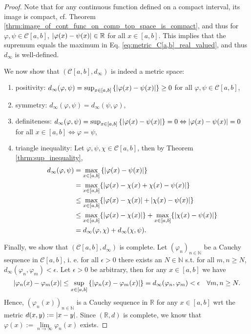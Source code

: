 \begin{proof}
	Note that for any continuous function defined on a compact interval, its image is compact, cf. Theorem \ref{thrm:image_of_cont_func_on_comp_top_space_is_compact}, and thus for $\varphi, \psi\in \mathcal C[a, b]$, $\left\vert \varphi(x) - \psi(x) \right\vert\in\mathbb R$ for all $x\in [a, b]$. This implies that the supremum equals the maximum in Eq. \eqref{eq:metric_C[a,b]_real_valued}, and thus $d_{\infty}$ is well-defined.

	We now show that $(\mathcal C[a, b], d_{\infty})$ is indeed a metric space:
	\begin{enumerate}
		\item positivity: $d_{\infty}(\varphi, \psi) = \sup_{x\in [a, b]}\left\{ \left\vert \varphi(x) - \psi(x) \right\vert \right\}\geq 0$ for all $\varphi, \psi\in\mathcal C[a, b]$,
		\item symmetry: $d_{\infty}(\varphi, \psi) = d_{\infty}(\psi, \varphi)$,
		\item definiteness: $d_{\infty}(\varphi, \psi) = \sup_{x\in [a, b]}\left\{ \left\vert \varphi(x) - \psi(x) \right\vert \right\} = 0 \Leftrightarrow \left\vert \varphi(x) - \psi(x) \right\vert = 0$ for all $x\in[a, b]\Leftrightarrow\varphi = \psi$,
		\item triangle inequality: Let $\varphi, \psi, \chi\in \mathcal C[a, b]$, then by Theorem \ref{thrm:sup_inequality}, \begin{align*}
			d_{\infty}(\varphi, \psi) &= \max_{x\in [a, b]}\left\{ \left\vert \varphi(x) - \psi(x) \right\vert \right\} 
			\\ &= \max_{x\in [a, b]}\{\left\vert \varphi(x) - \chi(x) + \chi(x) - \psi(x) \right\vert\}
			\\ &\leq \max_{x\in [a, b]}\{\left\vert \varphi(x) - \chi(x) \right\vert + \left\vert \chi(x) - \psi(x) \right\vert\}
			\\ &\leq \max_{x\in [a, b]}\{\left\vert \varphi(x) - \chi(x) \right\vert\} 
			+ \max_{x\in[a, b]}\{\left\vert \chi(x) - \psi(x) \right\vert\} \\ &= d_{\infty}(\varphi, \chi) + d_{\infty}(\chi, \psi).
		\end{align*}
	\end{enumerate}
	
	Finally, we show that $(\mathcal C[a, b], d_{\infty})$ is complete. Let $(\varphi_n)_{n\in\mathbb N}$ be a Cauchy sequence in $\mathcal C[a, b]$, i. e. for all $\epsilon > 0$ there exists an $N\in\mathbb N$ s.t. for all $m, n\geq N$, $d_{\infty}(\varphi_n, \varphi_m) < \epsilon$. Let $\epsilon > 0$ be arbitrary, then for any $x\in [a, b]$ we have
	\begin{align}
		\left\vert \varphi_n(x) - \varphi_m(x) \right\vert \leq \sup_{x\in [a, b]}\left\{ \left\vert \varphi_{n}(x) - \varphi_{m}(x) \right\vert \right\} = d_{\infty}(\varphi_n, \varphi_m) < \epsilon \quad\forall m, n\geq N.
	\end{align} 
	Hence, $\left(\varphi_n(x)\right)_{n\in\mathbb N}$ is a Cauchy sequence in $\mathbb R$ for any $x\in[a, b]$ wrt the metric $d(x, y) := \left\vert x - y \right\vert$. Since $\left(\mathbb R, d\right)$ is complete, we know that $\varphi(x) := \lim\limits_{n\to\infty}\varphi_n(x)$ exists. 
	

\end{proof}
